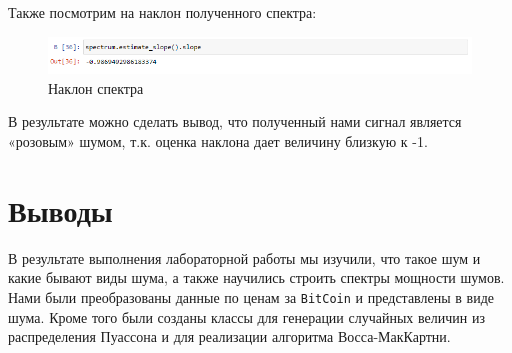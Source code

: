 \documentclass[a4paper]{article}
\begin{document}
            Также посмотрим на наклон полученного спектра:
            
            \begin{figure}[H]
                \centering
                \includegraphics[width=\textwidth]{ex_5_wave_estimate_slope.png}
                \caption{Наклон спектра}
                \label{fig:ex_5_wave_estimate_slope}
            \end{figure}
            
            В результате можно сделать вывод, что полученный нами сигнал является «розовым» шумом, т.к. оценка наклона дает величину близкую к -1.
            
    \newpage
        \section{Выводы}
            В результате выполнения лабораторной работы мы изучили, что такое шум и какие бывают виды шума, а также научились строить спектры мощности шумов. Нами были преобразованы данные по ценам за \texttt{BitCoin} и представлены в виде шума. Кроме того были созданы классы для генерации случайных величин из распределения Пуассона и для реализации алгоритма Восса-МакКартни.
            
\end{document}
